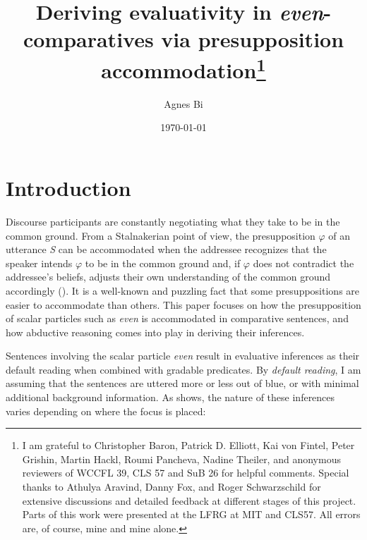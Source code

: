 \documentclass[12pt,letterpaper]{scrartcl}
\title{\LARGE Deriving evaluativity in \textit{even}-comparatives via presupposition accommodation\thanks{I am grateful to Christopher Baron, Patrick D. Elliott, Kai von Fintel, Peter Grishin, Martin Hackl, Roumi Pancheva, Nadine Theiler, and anonymous reviewers of WCCFL 39, CLS 57 and SuB 26 for helpful comments. Special thanks to Athulya Aravind, Danny Fox, and Roger Schwarzschild for extensive discussions and detailed feedback at different stages of this project. Parts of this work were presented at the LFRG at MIT and CLS57. All errors are, of course, mine and mine alone.}}
\author{\large Agnes Bi}
\date{\large \today}
\begin{document}

\setlength{\Exlabelsep}{0.6em}  %
\setlength{\SubExleftmargin}{1.6em}  %


\setlength{\abovedisplayskip}{0pt}
\setlength{\belowdisplayskip}{0pt}
\setlength{\abovedisplayshortskip}{0pt}
\setlength{\belowdisplayshortskip}{0pt}

\onehalfspacing

\maketitle

\section{Introduction}

Discourse participants are constantly negotiating what they take to be in the common ground. From a Stalnakerian point of view, the presupposition $\varphi$ of an utterance \textit{S} can be accommodated when the addressee recognizes that the speaker intends $\varphi$ to be in the common ground and, if $\varphi$ does not contradict the addressee's beliefs, adjusts their own understanding of the common ground accordingly (\cite{stalnaker_common_2002}). It is a well-known and puzzling fact that some presuppositions are easier to accommodate than others. This paper focuses on how the presupposition of scalar particles such as \textit{even} is accommodated in comparative sentences, and how abductive reasoning comes into play in deriving their inferences.

Sentences involving the scalar particle \textit{even} result in evaluative inferences as their default reading when combined with gradable predicates. By \textit{default reading}, I am assuming that the sentences are uttered more or less out of blue, or with minimal additional background information. As \Next shows, the nature of these inferences varies depending on where the focus is placed:
\end{document}
